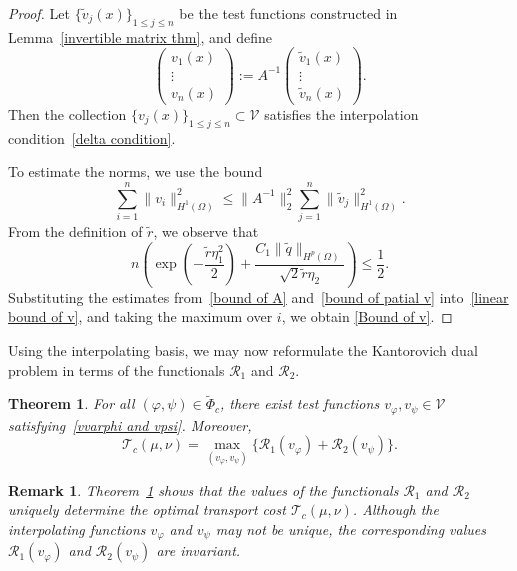 \documentclass[12pt]{amsart}
\newtheorem{thm}{Theorem}
\newtheorem{remark}{Remark}
\begin{document}
\begin{proof}
Let \( \{\tilde{v}_j(x)\}_{1 \leq j \leq n} \) be the test functions constructed in Lemma~\ref{invertible matrix thm}, and define
\[
\begin{pmatrix}
v_1(x) \\
\vdots \\
v_n(x)
\end{pmatrix}
:= A^{-1}
\begin{pmatrix}
\tilde{v}_1(x) \\
\vdots \\
\tilde{v}_n(x)
\end{pmatrix}.
\]
Then the collection \( \{v_j(x)\}_{1 \leq j \leq n} \subset \mathcal{V} \) satisfies the interpolation condition~\eqref{delta condition}.

To estimate the norms, we use the bound
\begin{equation}\label{linear bound of v}
    \sum_{i=1}^n \|v_i\|_{H^1(\Omega)}^2 \leq \|A^{-1}\|_2^2 \sum_{j=1}^n \|\tilde{v}_j\|_{H^1(\Omega)}^2.
\end{equation}
From the definition of \( \tilde{r} \), we observe that
\[
n\left( \exp\left( -\frac{\tilde{r} \eta_1^2}{2} \right) + \frac{C_1 \|\tilde{q}\|_{H^p(\Omega)}}{\sqrt{2} \tilde{r} \eta_2} \right) \leq \frac{1}{2}.
\]
Substituting the estimates from~\eqref{bound of A} and~\eqref{bound of patial v} into~\eqref{linear bound of v}, and taking the maximum over \( i \), we obtain \eqref{Bound of v}.
\end{proof}

Using the interpolating basis, we may now reformulate the Kantorovich dual problem in terms of the functionals $\mathcal{R}_1$ and $\mathcal{R}_2$.

\begin{thm}\label{two v thm}
For all $(\varphi,\psi)\in\widetilde{\Phi}_c$, there exist test functions $v_{\varphi},v_{\psi}\in\mathcal{V}$ satisfying~\eqref{vvarphi and vpsi}. Moreover,
\[
\mathcal{T}_c(\mu,\nu)=\max_{(v_\varphi,v_\psi)}\bigl\{\mathcal{R}_1(v_\varphi)+\mathcal{R}_2(v_\psi)\bigr\}.
\]
\end{thm}

\begin{remark}
Theorem~\ref{two v thm} shows that the values of the functionals $\mathcal{R}_1$ and $\mathcal{R}_2$ uniquely determine the optimal transport cost $\mathcal{T}_c(\mu,\nu)$. Although the interpolating functions $v_\varphi$ and $v_\psi$ may not be unique, the corresponding values $\mathcal{R}_1(v_\varphi)$ and $\mathcal{R}_2(v_\psi)$ are invariant.
\end{remark}
\end{document}
